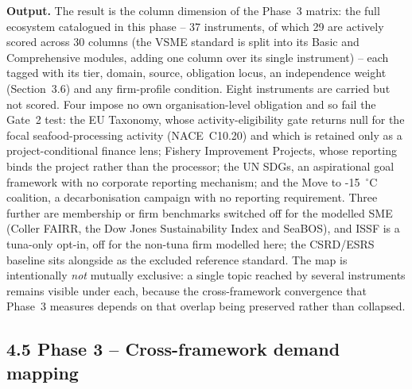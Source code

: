 \documentclass[
]{article}
\begin{document}
\textbf{Output.} The result is the column dimension of the Phase~3
matrix: the full ecosystem catalogued in this phase -- 37 instruments,
of which 29 are actively scored across 30 columns (the VSME standard is
split into its Basic and Comprehensive modules, adding one column over its
single instrument) -- each tagged with its tier, domain, source,
obligation locus, an independence weight (Section~3.6) and any
firm-profile condition. Eight instruments are carried but not scored.
Four impose no own organisation-level obligation and so fail the Gate~2
test: the EU Taxonomy, whose activity-eligibility gate returns null for
the focal seafood-processing activity (NACE~C10.20) and which is retained
only as a project-conditional finance lens; Fishery Improvement Projects,
whose reporting binds the project rather than the processor; the UN SDGs,
an aspirational goal framework with no corporate reporting mechanism; and
the Move to -15~$^{\circ}$C coalition, a decarbonisation campaign with no
reporting requirement. Three further are membership or firm benchmarks
switched off for the modelled SME (Coller FAIRR, the Dow Jones
Sustainability Index and SeaBOS), and ISSF is a tuna-only opt-in, off for
the non-tuna firm modelled here; the CSRD/ESRS baseline sits alongside as
the excluded reference standard. The map is intentionally
\emph{not} mutually exclusive: a single topic reached by several
instruments remains visible under each, because the cross-framework
convergence that Phase~3 measures depends on that overlap being preserved
rather than collapsed.

\subsection{4.5 Phase 3 -- Cross-framework demand mapping}
\label{phase-3---cross-framework-demand-mapping}
\end{document}
